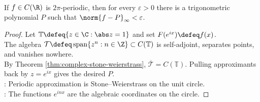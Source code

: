 \begin{corollary} \label{cor:trigonometric-polynomial-weierstrass} \\
If $f\in C(\R)$ is $2\pi$-periodic, then for every $\varepsilon>0$ there is a trigonometric polynomial $P$ such that $\norm{f-P}_\infty<\varepsilon$.
\begin{proof}
Let $\mathbb{T}\defeq\{z\in\C:\abs z=1\}$ and set $F(e^{ix})\defeq f(x)$.\\
The algebra $\mathcal{T}\defeq\operatorname{span}\{z^n:n\in\Z\}\subset C(\mathbb{T})$ is self-adjoint, separates points, and vanishes nowhere.\\
By Theorem \ref{thm:complex-stone-weierstrass}, $\overline{\mathcal{T}}=C(\mathbb{T})$. Pulling approximants back by $z=e^{ix}$ gives the desired $P$.\\
: Periodic approximation is Stone--Weierstrass on the unit circle.\\
: The functions $e^{inx}$ are the algebraic coordinates on the circle.
\end{proof}
\end{corollary}

